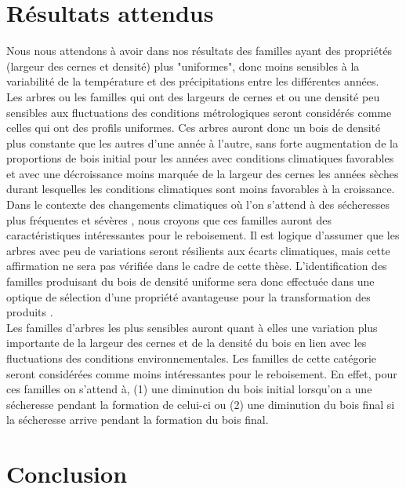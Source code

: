 \documentclass[a4paper,12pt]{report}
\begin{document}
\section{Résultats attendus}

Nous nous attendons à avoir dans nos résultats des familles ayant des propriétés (largeur des cernes et densité) plus "uniformes", donc moins sensibles à la variabilité de la température et des précipitations entre les différentes années.\\ 

Les arbres ou les familles qui ont des largeurs de cernes et ou une densité peu sensibles aux fluctuations des conditions métrologiques seront considérés comme celles qui ont des profils uniformes. Ces arbres auront donc un bois de densité plus constante que les autres d'une année à l'autre, sans forte augmentation de la proportions de bois initial pour les années avec conditions climatiques favorables et avec une décroissance moins marquée de la largeur des cernes les années sèches durant lesquelles les conditions climatiques sont moins favorables à la croissance. Dans le contexte des changements climatiques où l'on s'attend à des sécheresses plus fréquentes et sévères \citep{IPCC_2015}, nous croyons que ces familles auront des caractéristiques intéressantes pour le reboisement. Il est logique d'assumer que les arbres avec peu de variations seront résilients aux écarts climatiques, mais cette affirmation ne sera pas vérifiée dans le cadre de cette thèse. L'identification des familles produisant du bois de densité uniforme sera donc effectuée dans une optique de sélection d'une propriété avantageuse pour la transformation des produits \citep{Hernandez2001}. \\ 

Les familles d'arbres les plus sensibles auront quant à elles une variation plus importante de la largeur des cernes et de la densité du bois en lien avec les fluctuations des conditions environnementales. Les familles de cette catégorie seront considérées comme moins intéressantes pour le reboisement. En effet, pour ces familles on s'attend à, (1) une diminution du bois initial lorsqu'on a une sécheresse pendant la formation de celui-ci ou (2) une diminution du bois final si la sécheresse arrive pendant la formation du bois final.\\


\section{Conclusion}
\end{document}
